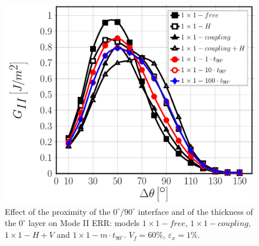\documentclass[review]{elsarticle}
\begin{document}
\begin{figure}[!h]
\centering
\includegraphics[width=\textwidth]{1x1-i-vf60-GII.pdf}
\caption{Effect of the proximity of the $0^{\circ}/90^{\circ}$ interface and of the thickness of the $0^{\circ}$ layer on Mode II ERR: models $1\times 1-free$, $1\times 1-coupling$, $1\times 1-H+V$ and $1\times 1-m\cdot t_{90^{\circ}}$. $V_{f}=60\%$, $\varepsilon_{x}=1\%$.}\label{fig:thicknessGII}
\end{figure}
\end{document}

